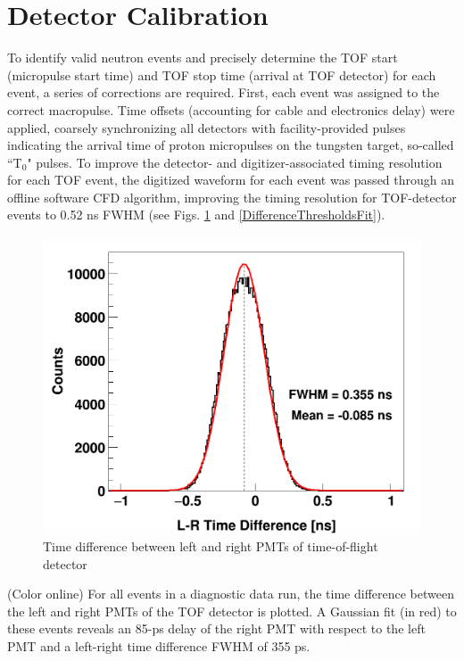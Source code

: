 \section{Detector Calibration}
To identify valid neutron events and precisely determine the TOF start (micropulse start 
time) and TOF stop time (arrival at TOF detector) for each event, a series of corrections 
are required.  First, each event was assigned to the correct macropulse.
Time offsets (accounting for cable and
electronics delay) were applied, coarsely synchronizing all detectors with
facility-provided pulses indicating the arrival time of proton micropulses on the
tungsten target, so-called ``T$_{0}$" pulses.
To improve the detector- and digitizer-associated timing resolution for each TOF
event, the digitized waveform for each event was passed 
through an offline software CFD algorithm, improving the timing resolution 
for TOF-detector events to 0.52 ns FWHM (see Figs. \ref{LRTimeDifferenceLinear}
and \ref{DifferenceThresholdsFit}).

\begin{figure}
    \includegraphics[scale=0.3]{figures/Difference_Linear.png}
    \caption{Time difference between left and right PMTs of time-of-flight detector}
    \label{LRTimeDifferenceLinear}
\end{figure}

(Color online) For all events in a diagnostic data run, the time difference   
        between the left and right PMTs of the TOF detector is plotted.
        A Gaussian fit (in red) to these events reveals an 85-ps delay of the right PMT with 
    respect to the left PMT and a left-right time difference FWHM of 355 ps.

